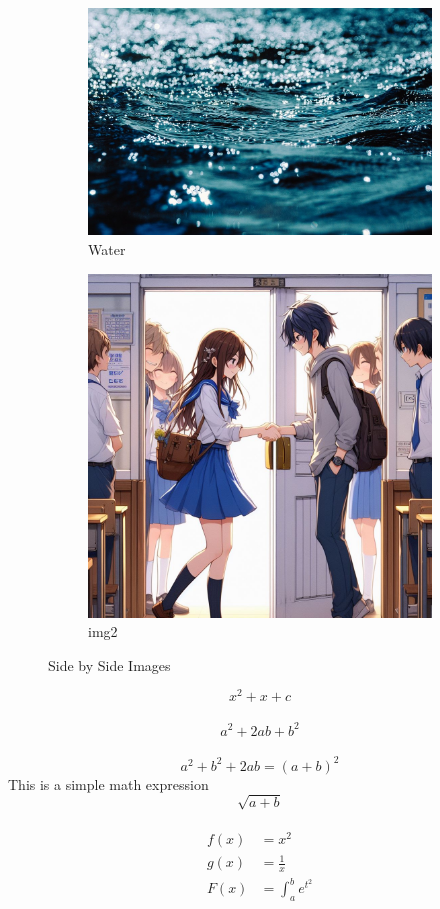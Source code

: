 \documentclass{article}
\begin{document}
 \begin{figure}[h]
 	\centering
 	\begin{subfigure}
 		{0,45\textwidth}
 		\centering
 		\includegraphics[width=0.9\linewidth]{img}
 		\caption{Water}
 		\label{fig:img1}
 	\end{subfigure}
 \hfill
    \begin{subfigure}{0.45\textwidth}
    	\includegraphics[width=0.9\linewidth]{img2}
    	\caption{img2}
    	\label{fig:img2}
    	
    \end{subfigure}
   \caption{Side by Side Images}
 \end{figure}
	\[x^2 + x + c\]\
	\[a^2 + 2ab + b^2\]\
	\begin{equation}
		a^2 + b^2 + 2ab = (a+b)^2 
	\end{equation}
    This is a simple math expression \[\sqrt{a+b}\]\
    \begin{align}
    	f(x) & = x^2 \\
    	g(x) & = \frac{1}{x} \\
    	F(x) & = \int_{a}^{b}{e^{t^2}}
    \end{align}
\end{document}
